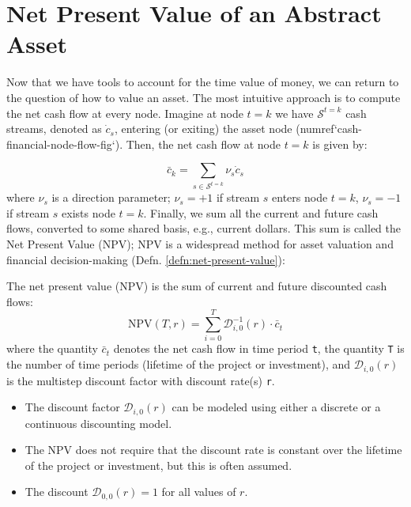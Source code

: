 \documentclass[11pt]{article}
\theoremstyle{definition}
\begin{document}
\section*{Net Present Value of an Abstract Asset}
Now that we have tools to account for the time value of money, we can return to the question of how to value an asset. 
The most intuitive approach is to compute the net cash flow at every node. Imagine at node $t=k$ we have $\mathcal{S}^{t=k}$ cash streams,
denoted as $\dot{c}_{s}$, entering (or exiting) the asset node ({numref}`cash-financial-node-flow-fig`). Then, the net cash flow at node $t=k$ is given by:

\begin{equation}\label{eq:net-cash-flow}
\bar{c}_{k} = \sum_{s\in\mathcal{S}^{t=k}}\nu_{s}\dot{c}_{s}
\end{equation}
where $\nu_{s}$ is a direction parameter; $\nu_{s}=+1$ if stream $s$ enters node $t=k$, $\nu_{s}=-1$ if stream $s$ exists node $t=k$. 
Finally, we sum all the current and future cash flows, converted to some shared basis, e.g., current dollars. 
This sum is called the Net Present Value (NPV); NPV is a widespread method for asset valuation and financial decision-making 
(Defn. \ref{defn:net-present-value}): 

\begin{definition}\label{defn:net-present-value}
The net present value (NPV) is the sum of current and future discounted cash flows:
\begin{equation}    
\text{NPV}(T,r) = \sum_{i=0}^{T}{\mathcal{D}_{i,0}^{-1}}(r)\cdot\bar{c}_{t}
\end{equation}
where the quantity $\bar{c}_{t}$ denotes the net cash flow in time period \texttt{t}, the quantity \texttt{T} is the number of time periods 
(lifetime of the project or investment), and $\mathcal{D}_{i,0}(r)$ is the multistep discount factor with discount rate(s) \texttt{r}.
\begin{itemize}
\item{The discount factor $\mathcal{D}_{i,0}(r)$ can be modeled using either a discrete or a continuous discounting model.}
\item{The NPV does not require that the discount rate is constant over the lifetime of the project or investment, but this is often assumed.}
\item{The discount  $\mathcal{D}_{0,0}(r) = 1$ for all values of $r$.}
\end{itemize}
\end{definition}
\end{document}
